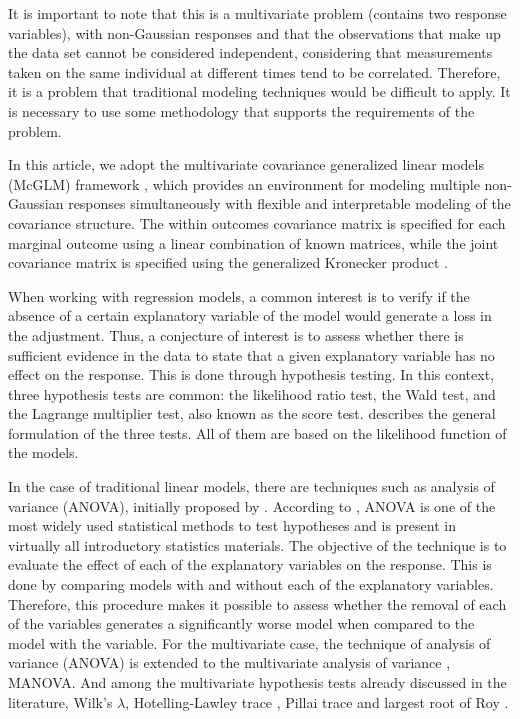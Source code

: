 \documentclass[AMA,STIX1COL]{WileyNJD-v2}
\begin{document}
It is important to note that this is a multivariate problem (contains two response variables), with non-Gaussian responses and that the observations that make up the data set cannot be considered independent, considering that measurements taken on the same individual at different times tend to be correlated. Therefore, it is a problem that traditional modeling techniques would be difficult to apply. It is necessary to use some methodology that supports the requirements of the problem.

In this article, we adopt the multivariate covariance generalized linear models (McGLM) framework \cite{Bonat16}, which provides an environment for modeling multiple non-Gaussian responses simultaneously with flexible and interpretable modeling of the covariance structure. The within outcomes covariance matrix is specified for each marginal outcome using a linear combination of known matrices, while the joint covariance matrix is specified using the generalized Kronecker product \cite{martinez13,Bonat16}.


When working with regression models, a common interest is to verify if the absence of a certain explanatory variable of the model would generate a loss in the adjustment. Thus, a conjecture of interest is to assess whether there is sufficient evidence in the data to state that a given explanatory variable has no effect on the response. This is done through hypothesis testing. In this context, three hypothesis tests are common: the likelihood ratio test, the Wald test, and the Lagrange multiplier test, also known as the score test. \cite{engle} describes the general formulation of the three tests. All of them are based on the likelihood function of the models. 


In the case of traditional linear models, there are techniques such as analysis of variance (ANOVA), initially proposed by \cite{anova_fisher}. According to \cite{anova1}, ANOVA is one of the most widely used statistical methods to test hypotheses and is present in virtually all introductory statistics materials. The objective of the technique is to evaluate the effect of each of the explanatory variables on the response. This is done by comparing models with and without each of the explanatory variables. Therefore, this procedure makes it possible to assess whether the removal of each of the variables generates a significantly worse model when compared to the model with the variable. For the multivariate case, the technique of analysis of variance (ANOVA) is extended to the multivariate analysis of variance \citep{manova}, MANOVA. And among the multivariate hypothesis tests already discussed in the literature, Wilk's \cite{wilks} $\lambda$, Hotelling-Lawley trace \cite{lawley,hotelling}, Pillai trace \cite{pillai} and largest root of Roy \cite{roy}.
\end{document}
